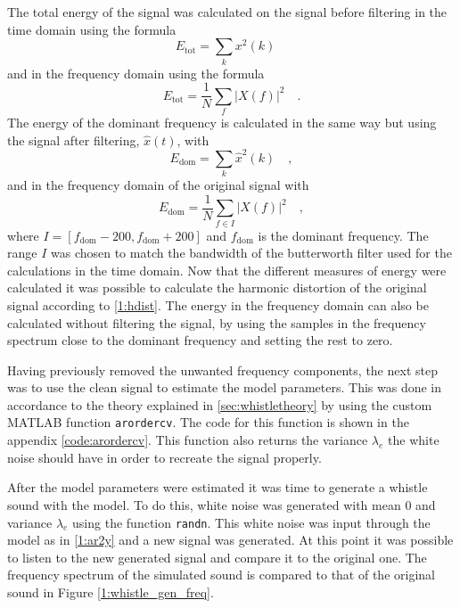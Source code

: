 \documentclass{IEEEtran}
\newcommand{\code}[1]{\texttt{#1}}
\begin{document}
The total energy of the signal was calculated on the signal before filtering
in the time domain using the formula
\begin{equation*}
    E_{\text{tot}} = \sum_k{x^2(k)} \quad
\end{equation*}
and in the frequency domain using the formula
\begin{equation*}
    E_{\text{tot}} = \frac{1}{N}\sum_f{|X(f)|^2} \quad .
\end{equation*}
The energy of the dominant frequency is calculated in the same way but
using the signal after filtering, $\hat{x}(t)$, with
\begin{equation*}
    E_{\text{dom}} = \sum_k{\hat{x}^2(k)} \quad ,
\end{equation*}
and in the frequency domain of the original signal with
\begin{equation*}
    E_{\text{dom}} = \frac{1}{N}\sum_{f \in I}{|X(f)|^2} \quad ,
\end{equation*}
where $I = [f_{\text{dom}} - 200, f_{\text{dom}} + 200]$ and $f_{\text{dom}}$
is the dominant
frequency. The range $I$ was chosen to match the bandwidth of the butterworth
filter used for the calculations in the time domain.
Now that the different measures of energy were calculated it was possible to
calculate the harmonic distortion of the original signal according to
\eqref{1:hdist}. The energy in the frequency domain can also be calculated
without filtering the signal, by using the samples in the frequency spectrum
close to the dominant frequency and setting the rest to zero.

Having previously removed the unwanted frequency components, the next
step was to use the clean signal to estimate the model parameters.
This was done in accordance to the theory explained in \ref{sec:whistletheory}
by using the custom MATLAB function \code{arordercv}. The code for this
function is shown in the appendix \ref{code:arordercv}. This function also
returns the variance $\lambda_e$ the white noise should have in order to
recreate the signal properly.

After the model parameters were estimated it was time to generate a whistle
sound with the model. To do this, white noise was generated with mean $0$
and variance $\lambda_e$ using the function \code{randn}. This white noise
was input through the model as in \eqref{1:ar2y} and a new signal
was generated. At this point it was possible to listen to the new generated
signal and compare it to the original one. The frequency spectrum of the
simulated sound is compared to that of the original sound in Figure
\ref{1:whistle_gen_freq}.
\end{document}
